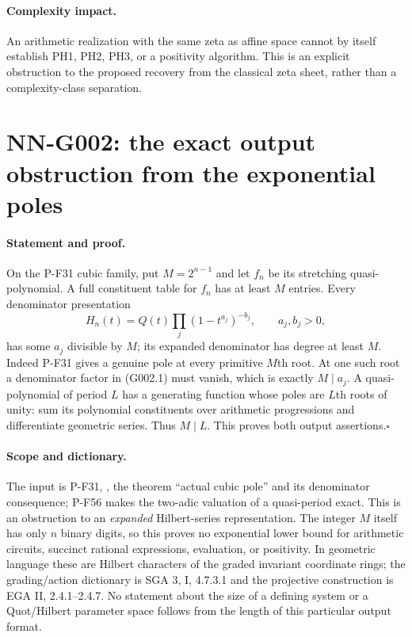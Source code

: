 \paragraph{Complexity impact.}
An arithmetic realization with the same zeta as affine space cannot
by itself establish PH1, PH2, PH3, or a positivity algorithm. This is
an explicit obstruction to the proposed recovery from the classical
zeta sheet, rather than a complexity-class separation.



\section{NN-G002: the exact output obstruction from the exponential poles}
\paragraph{Statement and proof.}
On the P-F31 cubic family, put $M=2^{n-1}$ and let $f_n$ be its
stretching quasi-polynomial. A full constituent table for $f_n$ has
at least $M$ entries. Every denominator presentation
\[
 H_n(t)=Q(t)\prod_j(1-t^{a_j})^{-b_j},\qquad a_j,b_j>0,
 \tag{G002.1}
\]
has some $a_j$ divisible by $M$; its expanded denominator has degree
at least $M$. Indeed P-F31 gives a genuine pole at every primitive
$M$th root. At one such root a denominator factor in (G002.1) must
vanish, which is exactly $M\mid a_j$. A quasi-polynomial of period
$L$ has a generating function whose poles are $L$th roots of unity:
sum its polynomial constituents over arithmetic progressions and
differentiate geometric series. Thus $M\mid L$. This proves both
output assertions.\hfill$\square$

\paragraph{Scope and dictionary.}
The input is P-F31, ,
the theorem ``actual cubic pole'' and its denominator consequence;
P-F56 makes the two-adic valuation of a quasi-period exact. This is
an obstruction to an \emph{expanded} Hilbert-series representation.
The integer $M$ itself has only $n$ binary digits, so this proves no
exponential lower bound for arithmetic circuits, succinct rational
expressions, evaluation, or positivity. In geometric language these
are Hilbert characters of the graded invariant coordinate rings;
the grading/action dictionary is SGA 3, I, 4.7.3.1 and the projective
construction is EGA II, 2.4.1--2.4.7. No statement about the size of
a defining system or a Quot/Hilbert parameter space follows from
the length of this particular output format.




